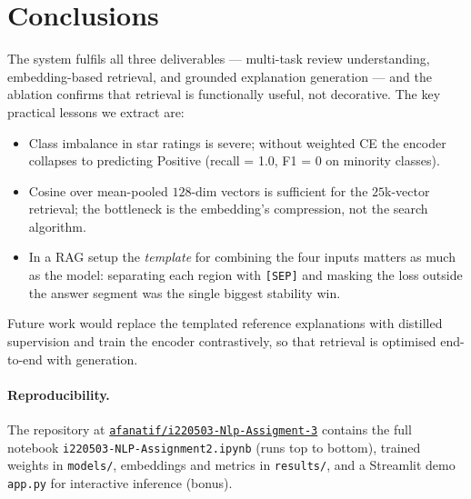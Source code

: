 \documentclass[11pt,a4paper]{article}
\begin{document}
\section{Conclusions}
The system fulfils all three deliverables --- multi-task review
understanding, embedding-based retrieval, and grounded explanation
generation --- and the ablation confirms that retrieval is functionally
useful, not decorative. The key practical lessons we extract are:
\begin{itemize}[leftmargin=*]
  \item Class imbalance in star ratings is severe; without weighted CE the
        encoder collapses to predicting Positive (recall = 1.0, F1 = 0 on
        minority classes).
  \item Cosine over mean-pooled $128$-dim vectors is sufficient for the
        $25$k-vector retrieval; the bottleneck is the embedding's
        compression, not the search algorithm.
  \item In a RAG setup the \emph{template} for combining the four inputs
        matters as much as the model: separating each region with
        \texttt{[SEP]} and masking the loss outside the answer segment
        was the single biggest stability win.
\end{itemize}
Future work would replace the templated reference explanations with
distilled supervision and train the encoder contrastively, so that
retrieval is optimised end-to-end with generation.

\paragraph{Reproducibility.}
The repository at
\href{https://github.com/afanatif/i220503-Nlp-Assigment-3}{\texttt{afanatif/i220503-Nlp-Assigment-3}}
contains the full notebook \texttt{i220503-NLP-Assignment2.ipynb} (runs top
to bottom), trained weights in \texttt{models/}, embeddings and metrics in
\texttt{results/}, and a Streamlit demo \texttt{app.py} for interactive
inference (bonus).
\end{document}

